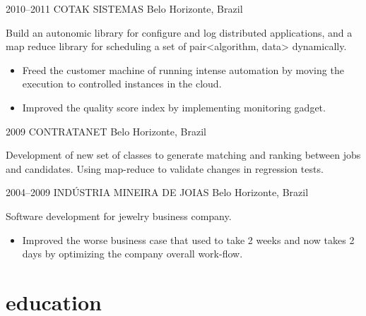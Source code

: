 \documentclass[]{friggeri-cv}
\begin{document}
\begin{entrylist}
\entry
{2010--2011}
{COTAK SISTEMAS}
{Belo Horizonte, Brazil}
{ Build an autonomic library for configure and log distributed applications, and a map reduce library for scheduling a set of pair<algorithm, data> dynamically. 

% 

  \begin{itemize}
    \item Freed the customer machine of running intense automation by moving the execution to controlled instances in the cloud.
    \item Improved the quality score index by implementing monitoring gadget.      
  \end{itemize}
}

\entry
{2009}
{CONTRATANET}
{Belo Horizonte, Brazil}
{ Development of new set of classes to generate matching and ranking between jobs and candidates. Using map-reduce to validate changes in regression tests. 

}


 \entry
 {2004--2009}
 {INDÚSTRIA MINEIRA DE JOIAS}
 {Belo Horizonte, Brazil}
 { Software development for jewelry business company.
  \begin{itemize}
    \item Improved the worse business case that used to take 2 weeks and now takes 2 days by optimizing the company overall work-flow.
  \end{itemize} }


\end{entrylist}

\section{education}
\end{document}
